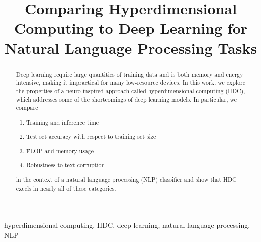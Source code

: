 \documentclass[conference]{IEEEtran}
\begin{document}
\title{Comparing Hyperdimensional Computing to Deep Learning for Natural Language Processing Tasks}

\author{
\and
{}
}

\maketitle

\begin{abstract}
    Deep learning require large quantities of training data and is both memory and energy intensive, making it impractical for many low-resource devices. In this work, we explore the properties of a neuro-inspired approach called hyperdimensional computing (HDC), which addresses some of the shortcomings of deep learning models. In particular, we compare 
    \begin{enumerate}
        \item Training and inference time
        \item Test set accuracy with respect to training set size
        \item FLOP and memory usage
        \item Robustness to text corruption    
    \end{enumerate}
    in the context of a natural language processing (NLP) classifier and show that HDC excels in nearly all of these categories.
\end{abstract}

\begin{IEEEkeywords}
hyperdimensional computing, HDC, deep learning, natural language processing, NLP
\end{IEEEkeywords}
\end{document}
